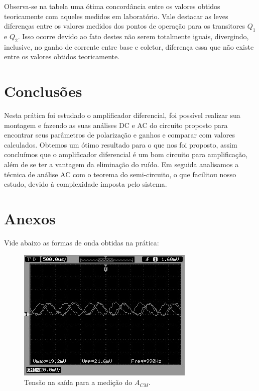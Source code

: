 Observa-se na tabela uma ótima concordância entre os valores obtidos teoricamente com aqueles medidos em laboratório. Vale destacar as leves diferenças entre os valores medidos dos pontos de operação para os transitores $Q_1$ e $Q_2$. Isso ocorre devido ao fato destes não serem totalmente iguais, divergindo, inclusive, no ganho de corrente entre base e coletor, diferença essa que não existe entre os valores obtidos teoricamente.

\section{Conclusões}

Nesta prática foi estudado o amplificador diferencial, foi possível realizar sua montagem e fazendo as suas análises DC e AC do circuito proposto para encontrar seus parâmetros de polarização e ganhos e comparar com valores calculados. Obtemos um ótimo resultado para o que nos foi proposto, assim concluímos que o amplificador diferencial é um bom circuito para  amplificação, além de se ter a vantagem da eliminação do ruído. Em seguida analisamos a técnica de análise AC com o teorema do semi-circuito, o que facilitou nosso estudo, devido à complexidade imposta pelo sistema.    

\newpage

\section{Anexos}
Vide abaixo as formas de onda obtidas na prática:

\begin{figure}[H] 
\includegraphics[scale=1]{imagens/acm.jpg} 
\centering
\caption{Tensão na saída para a medição do $A_{CM}$.}
\label{fig:acm} 
\end{figure} 

